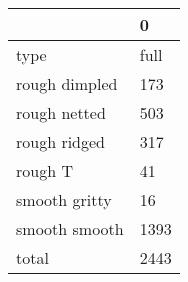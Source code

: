 \begin{tabular}{ll}
\toprule
{} &     0 \\
\midrule
type          &  full \\
rough dimpled &   173 \\
rough netted  &   503 \\
rough ridged  &   317 \\
rough T       &    41 \\
smooth gritty &    16 \\
smooth smooth &  1393 \\
total         &  2443 \\
\bottomrule
\end{tabular}
